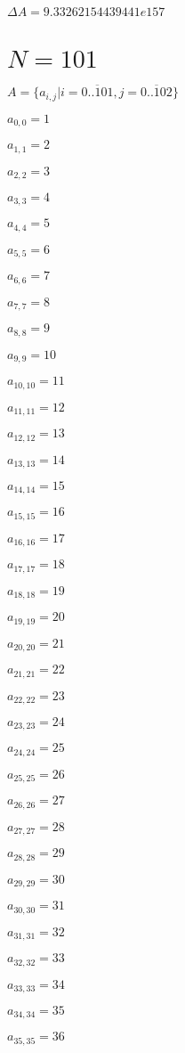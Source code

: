 \documentclass[a4paper,12pt]{article}
\begin{document}
$\Delta A = 9.33262154439441e157$



\section{ $N = 101$ }
$A = \{ a _{ i, j } | i = \overline { 0..101 }, j = \overline { 0..102 } \}$

$a _{ 0, 0 } = 1$

$a _{ 1, 1 } = 2$

$a _{ 2, 2 } = 3$

$a _{ 3, 3 } = 4$

$a _{ 4, 4 } = 5$

$a _{ 5, 5 } = 6$

$a _{ 6, 6 } = 7$

$a _{ 7, 7 } = 8$

$a _{ 8, 8 } = 9$

$a _{ 9, 9 } = 10$

$a _{ 10, 10 } = 11$

$a _{ 11, 11 } = 12$

$a _{ 12, 12 } = 13$

$a _{ 13, 13 } = 14$

$a _{ 14, 14 } = 15$

$a _{ 15, 15 } = 16$

$a _{ 16, 16 } = 17$

$a _{ 17, 17 } = 18$

$a _{ 18, 18 } = 19$

$a _{ 19, 19 } = 20$

$a _{ 20, 20 } = 21$

$a _{ 21, 21 } = 22$

$a _{ 22, 22 } = 23$

$a _{ 23, 23 } = 24$

$a _{ 24, 24 } = 25$

$a _{ 25, 25 } = 26$

$a _{ 26, 26 } = 27$

$a _{ 27, 27 } = 28$

$a _{ 28, 28 } = 29$

$a _{ 29, 29 } = 30$

$a _{ 30, 30 } = 31$

$a _{ 31, 31 } = 32$

$a _{ 32, 32 } = 33$

$a _{ 33, 33 } = 34$

$a _{ 34, 34 } = 35$

$a _{ 35, 35 } = 36$
\end{document}
